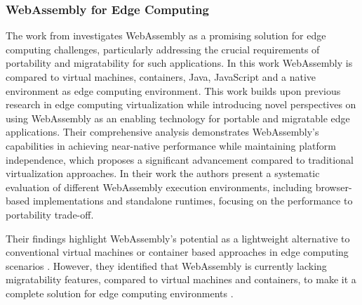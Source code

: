 \subsubsection{WebAssembly for Edge Computing}
\label{subsec:background:related_work:wasmedgecomputing}
The work from \citeauthor{relatedwork:wasmedgecomputing} \cite{relatedwork:wasmedgecomputing} investigates WebAssembly as a promising solution for edge computing challenges, particularly addressing the crucial requirements of portability and migratability for such applications. In this work WebAssembly is compared to virtual machines, containers, Java, JavaScript and a native environment as edge computing environment. This work builds upon previous research in edge computing virtualization while introducing novel perspectives on using WebAssembly as an enabling technology for portable and migratable edge applications. Their comprehensive analysis demonstrates WebAssembly's capabilities in achieving near-native performance while maintaining platform independence, which proposes a significant advancement compared to traditional virtualization approaches. In their work the authors present a systematic evaluation of different WebAssembly execution environments, including browser-based implementations and standalone runtimes, focusing on the performance to portability trade-off.

Their findings highlight WebAssembly's potential as a lightweight alternative to conventional virtual machines or container based approaches in edge computing scenarios \cite{relatedwork:wasmedgecomputing}. However, they identified that WebAssembly is currently lacking migratability features, compared to virtual machines and containers, to make it a complete solution for edge computing environments \cite{relatedwork:wasmedgecomputing}. 

